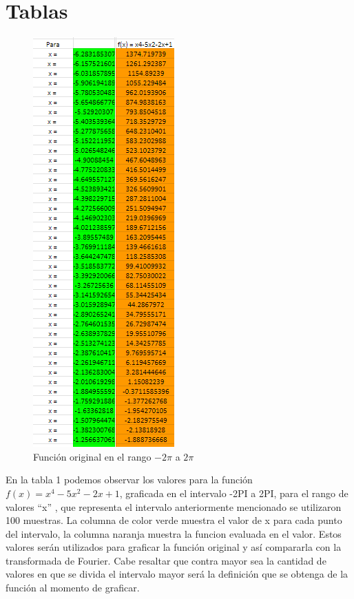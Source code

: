 \section{Tablas}

\begin{figure}[H]
    \centering
    \includegraphics[width=2.13542in,height=6.19792in]{media/image23.png}    
    \caption{Función original en el rango \(-2\pi\) a \(2\pi\)}
\end{figure}

En la tabla 1 podemos observar los valores para la función \(f(x) = x^4-5x^2-2x+1\), graficada en el intervalo -2PI a 2PI, para el rango de valores ``x'' , que representa el intervalo anteriormente mencionado se utilizaron 100 muestras. La columna de color verde muestra el valor de x para cada punto del intervalo, la columna naranja muestra la funcion evaluada en el valor. Estos valores serán utilizados para graficar la función original y así compararla con la transformada de Fourier. Cabe resaltar que contra mayor sea la cantidad de valores en que se divida el intervalo mayor será la definición que se obtenga de la función al momento de graficar.

